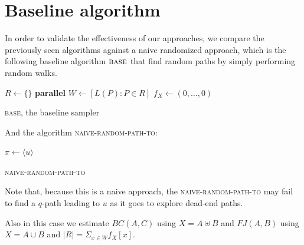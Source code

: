 \clearpage

\section{Baseline algorithm}

In order to validate the effectiveness of our approaches, we compare the previously seen algorithms against a naive randomized approach, which is the following baseline algorithm $\textsc{base}$ that find random paths by simply performing random walks.

\begin{algorithm}[h]
		
	\small
	\DontPrintSemicolon
	$R\gets\{\}$\;
	\textbf{parallel} 
	$W \gets [ L(P) : P \in R ]$\;
	$f_X \gets (0,\ldots,0)$\;
	\caption{\textsc{base}\xspace, the baseline sampler}
	\label{alg:base}
\end{algorithm}
	
And the algorithm \textsc{naive-random-path-to}:
	
\begin{algorithm}[h]
	\small
	\DontPrintSemicolon
	$\pi\gets \langle u \rangle$\;
	\Return{$\pi$}   
	\caption{\textsc{naive-random-path-to}}
	\label{alg:naive-random-path-to}
\end{algorithm}

Note that, because this is a naive approach, the \textsc{naive-random-path-to} may fail to find a $q$-path leading to $u$ as it goes to explore dead-end paths.

Also in this case we estimate $BC(A,C)$ using $X = A \uplus B$ and $FJ(A,B)$ using $X = A \cup B$ and $|R| = \Sigma_{x \in W} f_{X}[x]$.

\noindent

\clearpage

